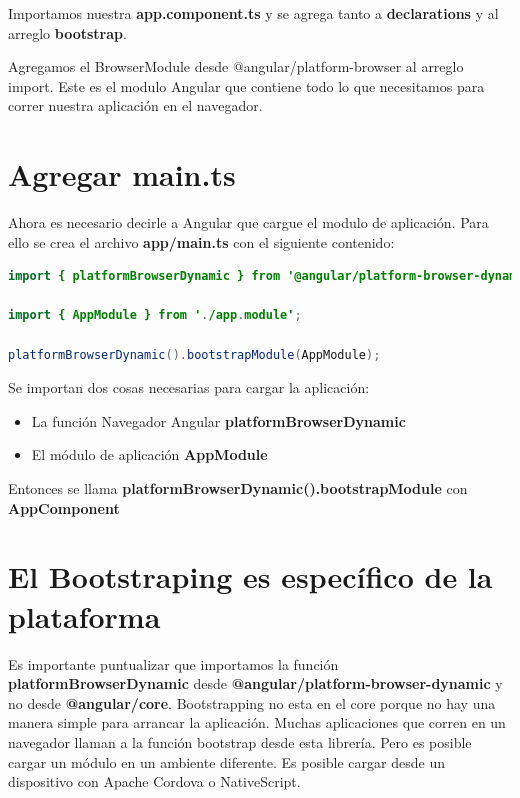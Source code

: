 \documentclass[12pt,twoside]{book}
\begin{document}
Importamos nuestra \textbf{app.component.ts} y se agrega tanto a \textbf{declarations} y al arreglo \textbf{bootstrap}.
 
Agregamos el BrowserModule desde @angular/platform-browser al arreglo import. Este es el modulo Angular que contiene todo lo que necesitamos para correr nuestra aplicación en el navegador.

\section{Agregar main.ts}

Ahora es necesario decirle a Angular que cargue el modulo de aplicación. Para ello se crea el archivo \textbf{app/main.ts} con el siguiente contenido:

\begin{lstlisting}[language=java]
import { platformBrowserDynamic } from '@angular/platform-browser-dynamic';

import { AppModule } from './app.module';

platformBrowserDynamic().bootstrapModule(AppModule);
\end{lstlisting}

Se importan dos cosas necesarias para cargar la aplicación:


\begin{itemize}
\item La función Navegador Angular  \textbf{platformBrowserDynamic}
\item El módulo de aplicación \textbf{AppModule}
\end{itemize}

Entonces se llama \textbf{platformBrowserDynamic().bootstrapModule} con \textbf{AppComponent}

\section{El Bootstraping es específico de la plataforma }

Es importante puntualizar que importamos la función \textbf{platformBrowserDynamic} desde \textbf{@angular/platform-browser-dynamic} y no desde \textbf{@angular/core}. Bootstrapping no esta en el core porque no hay una manera simple para arrancar la aplicación. Muchas aplicaciones que corren en un navegador llaman a la función bootstrap desde esta librería. Pero es posible cargar un módulo en un ambiente diferente. Es posible cargar desde un dispositivo con Apache Cordova o NativeScript. 
\end{document}
